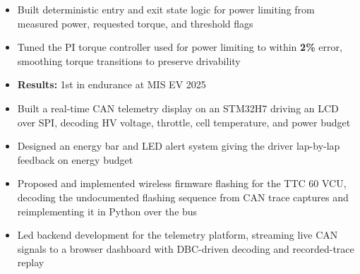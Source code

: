 \documentclass[10pt,letterpaper]{article}
\begin{document}
\entryspace

\orgline{\spartanracing}
\begin{itemize}
  \item Built deterministic entry and exit state logic for power limiting from measured power, requested torque, and threshold flags
  \item Tuned the PI torque controller used for power limiting to within \textbf{2\%} error, smoothing torque transitions to preserve drivability
  \item \textbf{Results:} 1st in endurance at MIS EV 2025
\end{itemize}


\orgline{\spartanracing}
\begin{itemize}
  \item Built a real-time CAN telemetry display on an STM32H7 driving an LCD over SPI, decoding HV voltage, throttle, cell temperature, and power budget
  \item Designed an energy bar and LED alert system giving the driver lap-by-lap feedback on energy budget
\end{itemize}

\entryspace

\begin{itemize}
  \item Proposed and implemented wireless firmware flashing for the TTC 60 VCU, decoding the undocumented flashing sequence from CAN trace captures and reimplementing it in Python over the bus
  \item Led backend development for the telemetry platform, streaming live CAN signals to a browser dashboard with DBC-driven decoding and recorded-trace replay
\end{itemize}
\end{document}
